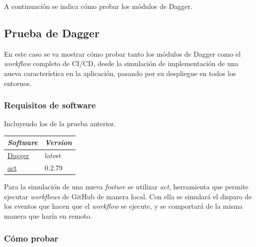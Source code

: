 A continuación se indica cómo probar los módulos de Dagger.

\subsection*{Prueba de Dagger}

En este caso se va mostrar cómo probar tanto los módulos de Dagger como el \textit{workflow} completo de CI/CD, desde la simulación de implementación de una nueva característica en la aplicación, pasando por su despliegue en todos los entornos.

\subsubsection*{Requisitos de software}

Incluyendo los de la prueba anterior.

\begin{table}
  \centering
  \begin{tabular}{|l|l|}
    \hline
    \textit{Software} & \textit{Version} \\ \hline
    \href{https://docs.dagger.io/install/}{Dagger} & latest \\ \hline
    \href{https://nektosact.com/installation/index.html}{act} & 0.2.79 \\ \hline
  \end{tabular}
\end{table}

Para la simulación de una nueva \textit{feature} se utilizar \textit{act}, herramienta que permite ejecutar \textit{workflows} de GitHub de manera local. Con ella se simulará el disparo de los eventos que hacen que el \textit{workflow} se ejecute, y se comportará de la misma manera que haría en remoto.

\subsubsection*{Cómo probar}

